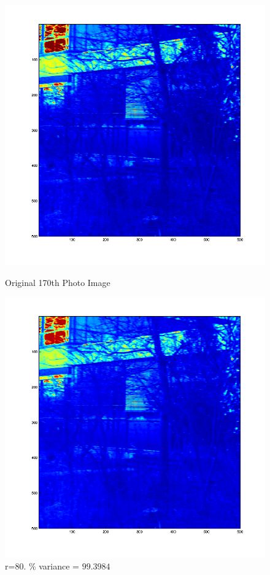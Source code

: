\documentclass[12pt,english]{article}
\begin{document}
\begin{figure}
\begin{minipage}{0.5\linewidth}
    \includegraphics[width=\linewidth]{pca-part-c-Photo_Images-original.png}
    \caption{Original 170th Photo Image}
\end{minipage}
\begin{minipage}{0.5\linewidth}
    \includegraphics[width=\linewidth]{pca-part-c-Photo_Images-reconstructed-r=80.png}
    \caption{r=80. \% variance = $99.3984$}
\end{minipage}
\end{figure}
\end{document}

